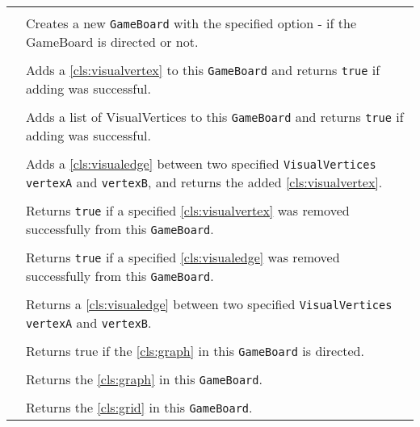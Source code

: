 \paragraph*{}
\begin{longtable}{Lp{10cm}}
	\startmethodtable
	 \\
	& Creates a new \texttt{GameBoard} with the specified option - if the GameBoard is directed or not. \\
	 \\
	& Adds a \ref{cls:visualvertex} to this \texttt{GameBoard} and returns \texttt{true} if adding was successful. \\
	 \\
	& Adds a list of VisualVertices to this \texttt{GameBoard} and returns \texttt{true} if adding was successful. \\
	 \\
	& Adds a \ref{cls:visualedge} between two specified \texttt{VisualVertices} \texttt{vertexA} and \texttt{vertexB}, and returns the added \ref{cls:visualvertex}. \\
	 \\
	& Returns \texttt{true} if a specified \ref{cls:visualvertex} was removed successfully from this \texttt{GameBoard}. \\
	 \\
	& Returns \texttt{true} if a specified \ref{cls:visualedge} was removed successfully from this \texttt{GameBoard}. \\
	 \\
	& Returns a \ref{cls:visualedge} between two specified \texttt{VisualVertices} \texttt{vertexA} and \texttt{vertexB}. \\
	 \\
	& Returns true if the \ref{cls:graph} in this \texttt{GameBoard} is directed. \\
	 \\
	& Returns the \ref{cls:graph} in this \texttt{GameBoard}. \\
	 \\
	& Returns the \ref{cls:grid} in this \texttt{GameBoard}. \\
	\hline
\end{longtable}

